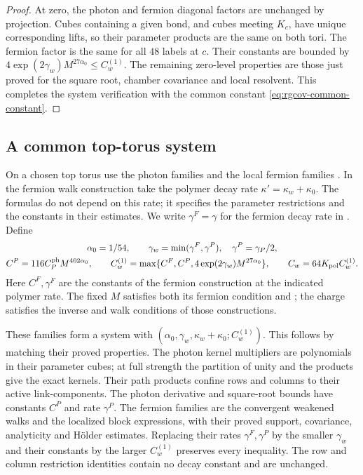 \begin{proof}
At zero, the photon and fermion diagonal factors
are unchanged by projection. Cubes containing a
given bond, and cubes meeting $K_c$, have unique
corresponding lifts, so their parameter products
are the same on both tori. The fermion factor is
the same for all $48$ labels at $c$.
Their constants are bounded by
$4\exp(2\gamma_w)M^{27\alpha_0}\le C_w^{(1)}$.
The remaining zero-level properties are those
just proved for the square root, chamber covariance
and local resolvent. This completes the system
verification with the common constant
\eqref{eq:rgcov-common-constant}.
\end{proof}

\subsection{A common top-torus system}
\label{subsec:rgcov-top-system}

On a chosen top torus use the photon families
 and the local
fermion families .
In the fermion walk construction take the polymer
decay rate $\kappa'=\kappa_w+\kappa_0$.
The formulas do not depend on this rate; it specifies
the parameter restrictions and the constants in their
estimates. We write $\gamma^F=\gamma$ for the fermion
decay rate in . Define
\begin{gather}
 \alpha_0=1/54,\qquad
 \gamma_w=\min(\gamma^F,\gamma^P),\quad
                                \gamma^P=\gamma_P/2, \notag\\
 C^P=116C_P^{\mathrm{ph}}M^{402\alpha_0},\qquad
 C_w^{(1)}=\max\{C^F,C^P,4\exp(2\gamma_w)M^{27\alpha_0}\},
 \qquad C_w=64K_{\mathrm{pol}}C_w^{(1)}.             \label{eq:rgcov-top-constants}
\end{gather}
Here $C^F,\gamma^F$ are the constants of the fermion
construction at the indicated polymer rate.
The fixed $M$ satisfies both its fermion condition and
; the charge satisfies
the inverse and walk conditions of those constructions.

These families form a system with
$(\alpha_0,\gamma_w,\kappa_w+\kappa_0;C_w^{(1)})$.
This follows by matching their proved properties.
The photon kernel multipliers are polynomials in their
parameter cubes; at full strength the partition of unity
and the products give the exact kernels. Their path
products confine rows and columns to their active
link-components. The photon derivative and square-root
bounds have constants $C^P$ and rate $\gamma^P$.
The fermion families are the convergent weakened walks
and the localized block expressions, with their proved
support, covariance, analyticity and H\"older estimates.
Replacing their rates $\gamma^F,\gamma^P$ by the smaller
$\gamma_w$ and their constants by the larger $C_w^{(1)}$
preserves every inequality. The row and column
restriction identities contain no decay constant and
are unchanged.

